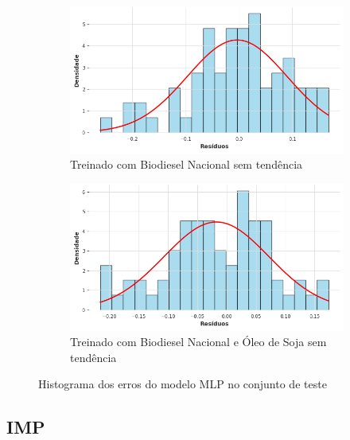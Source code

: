 \begin{figure}[htbp]
	\begin{subfigure}[b]{0.40\textwidth}
		\centering
		\includegraphics[width=\textwidth]{figuras/mlp_brasil_detrend_residuals_histogram.png} %
		\caption{Treinado com Biodiesel Nacional sem tendência}
		\label{fig:mlp_brasil_detrend_residuals_histogram}
	\end{subfigure}
	\hfill
	\begin{subfigure}[b]{0.40\textwidth}
		\centering
		\includegraphics[width=\textwidth]{figuras/mlp_brasil_oil_detrend_residuals_histogram.png} %
		\caption{Treinado com Biodiesel Nacional e Óleo de Soja sem tendência}
		\label{fig:mlp_brasil_oil_detrend_residuals_histogram}
	\end{subfigure}

	\caption{Histograma dos erros do modelo \acs{MLP} no conjunto de teste}
	\label{fig:mlp_residuals_histogram}
\end{figure}

\subsection{\acs{IMP}}
